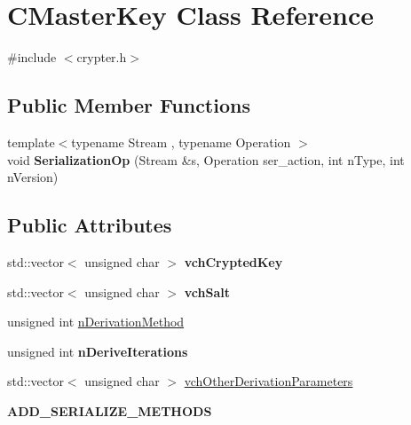 \hypertarget{class_c_master_key}{}\section{C\+Master\+Key Class Reference}
\label{class_c_master_key}


{\ttfamily \#include $<$crypter.\+h$>$}

\subsection*{Public Member Functions}
\begin{DoxyCompactItemize}
\item 
\mbox{\label{class_c_master_key_a32456e3080cf3a9818850f3c458594ea}} 
{\footnotesize template$<$typename Stream , typename Operation $>$ }\\void {\bfseries Serialization\+Op} (Stream \&s, Operation ser\+\_\+action, int n\+Type, int n\+Version)
\end{DoxyCompactItemize}
\subsection*{Public Attributes}
\begin{DoxyCompactItemize}
\item 
\mbox{\label{class_c_master_key_ab52e0eaabb0eb3af78fc4879c192e163}} 
std\+::vector$<$ unsigned char $>$ {\bfseries vch\+Crypted\+Key}
\item 
\mbox{\label{class_c_master_key_a00009f4b4feaa2ebe630a0d7cc854d3a}} 
std\+::vector$<$ unsigned char $>$ {\bfseries vch\+Salt}
\item 
unsigned int \mbox{\hyperlink{class_c_master_key_a7a4b1e432a30011297f496441769957f}{n\+Derivation\+Method}}
\item 
\mbox{\label{class_c_master_key_aec53e0be82d1053cf5a70a67fd4cc25d}} 
unsigned int {\bfseries n\+Derive\+Iterations}
\item 
std\+::vector$<$ unsigned char $>$ \mbox{\hyperlink{class_c_master_key_abfd00b311d5e5cf9ae1a6f3877ed35f7}{vch\+Other\+Derivation\+Parameters}}
\item 
\mbox{\label{class_c_master_key_a0e49e2a9206051c91388b2077eacb8c8}} 
{\bfseries A\+D\+D\+\_\+\+S\+E\+R\+I\+A\+L\+I\+Z\+E\+\_\+\+M\+E\+T\+H\+O\+DS}
\end{DoxyCompactItemize}



